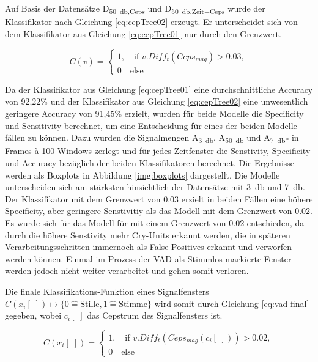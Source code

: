 Auf Basis der Datensätze D\textsubscript{\SI{50}{\decibel},Ceps} und D\textsubscript{\SI{50}{\decibel},Zeit+Ceps} wurde der Klassifikator nach Gleichung \ref{eq:cepTree02} erzeugt. Er unterscheidet sich von dem Klassifikator aus Gleichung \ref{eq:cepTree01} nur durch den Grenzwert.

\begin{equation}
C(v) = \begin{cases}
1, \quad \text{if } v.Diff_t(Ceps_{mag}) > 0.03, \\
0 \quad \text{else}
\end{cases}
\label{eq:cepTree02}
\end{equation}

Da der Klassifikator aus Gleichung \ref{eq:cepTree01} eine durchschnittliche Accuracy von 92,22\% und der Klassifikator aus Gleichung \ref{eq:cepTree02} eine unwesentlich geringere Accuracy von 91,45\% erzielt, wurden für beide Modelle die Specificity und Sensitivity berechnet, um eine Entscheidung für eines der beiden Modelle fällen zu können. Dazu wurden die Signalmengen A\textsubscript{\SI{3}{\decibel}}, A\textsubscript{\SI{50}{\decibel}} und A\textsubscript{\SI{7}{\decibel}*} in Frames \`{a} 100 Windows zerlegt und für jedes Zeitfenster die Senstivity, Specificity und Accuracy bezüglich der beiden Klassifikatoren berechnet. Die Ergebnisse werden als Boxplots in Abbildung \ref{img:boxplots} dargestellt. Die Modelle unterscheiden sich am stärksten hinsichtlich der Datensätze mit \SI{3}{\decibel} und \SI{7}{\decibel}. Der Klassifikator mit dem Grenzwert von 0.03 erzielt in beiden Fällen eine höhere Specificity, aber geringere Senstivitiy als das Modell mit dem Grenzwert von 0.02. Es wurde sich für das Modell für mit einem Grenzwert von 0.02 entschieden, da durch die höhere Senstivity mehr Cry-Units erkannt werden, die in späteren Verarbeitungsschritten immernoch als False-Positives erkannt und verworfen werden können. Einmal im Prozess der VAD als Stimmlos markierte Fenster werden jedoch nicht weiter verarbeitet und gehen somit \glqq verloren\grqq. 

Die finale Klassifikations-Funktion eines Signalfensters $C(x_i[\;]) \mapsto \{ 0 \hat{=} \text{Stille}, 1 \hat{=} \text{Stimme}\}$ wird somit durch Gleichung \ref{eq:vad-final} gegeben, wobei $c_i[\;]$ das Cepstrum des Signalfensters ist.

\begin{equation}
C(x_i[\;]) = \begin{cases}
1, \quad \text{if } v.Diff_t(Ceps_{mag}(c_i[\;])) > 0.02, \\
0 \quad \text{else}
\end{cases}
\label{eq:vad-final}
\end{equation}

